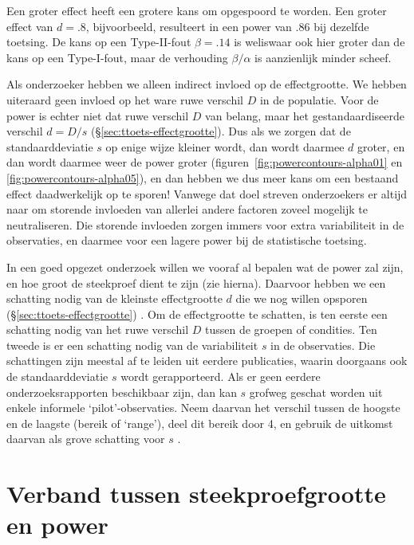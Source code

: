 \documentclass[
]{book}
\begin{document}
Een groter effect heeft een grotere kans om opgespoord te worden. Een
groter effect van \(d=.8\), bijvoorbeeld, resulteert in een power van
\(.86\) bij dezelfde toetsing. De kans op een Type-II-fout \(\beta=.14\) is
weliswaar ook hier groter dan de kans op een Type-I-fout, maar de
verhouding \(\beta/\alpha\) is aanzienlijk minder scheef.

Als onderzoeker hebben we alleen indirect invloed op de effectgrootte.
We hebben uiteraard geen invloed op het ware ruwe verschil \(D\) in de
populatie. Voor de power is echter niet dat ruwe verschil \(D\) van
belang, maar het gestandaardiseerde verschil \(d=D/s\)
(§\ref{sec:ttoets-effectgrootte}). Dus als we zorgen dat de
standaarddeviatie \(s\) op enige wijze kleiner wordt, dan wordt daarmee
\(d\) groter, en dan wordt daarmee weer de power groter
(figuren~\ref{fig:powercontours-alpha01} en \ref{fig:powercontours-alpha05}),
en dan hebben we dus meer kans
om een bestaand effect daadwerkelijk op te sporen! Vanwege dat doel
streven onderzoekers er altijd naar om storende invloeden van allerlei
andere factoren zoveel mogelijk te neutraliseren. Die storende invloeden
zorgen immers voor extra variabiliteit in de observaties, en daarmee
voor een lagere power bij de statistische toetsing.

In een goed opgezet onderzoek willen we vooraf al bepalen wat de power
zal zijn, en hoe groot de steekproef dient te zijn (zie hierna).
Daarvoor hebben we een schatting nodig van de kleinste effectgrootte \(d\)
die we nog willen opsporen
(§\ref{sec:ttoets-effectgrootte}) \citep{Quene10}. Om de effectgrootte te
schatten, is ten eerste een schatting nodig van het ruwe verschil \(D\)
tussen de groepen of condities. Ten tweede is er een schatting nodig van
de variabiliteit \(s\) in de observaties. Die schattingen zijn meestal af
te leiden uit eerdere publicaties, waarin doorgaans ook de
standaarddeviatie \(s\) wordt gerapporteerd. Als er geen eerdere
onderzoeksrapporten beschikbaar zijn, dan kan \(s\) grofweg geschat worden
uit enkele informele `pilot'-observaties. Neem daarvan het verschil
tussen de hoogste en de laagste (bereik of `range'), deel dit bereik
door 4, en gebruik de uitkomst daarvan als grove schatting voor \(s\)
\citep{PD08}.

\hypertarget{sec:steekproefgrootte-power}{%
\section{Verband tussen steekproefgrootte en power}\label{sec:steekproefgrootte-power}}
\end{document}
